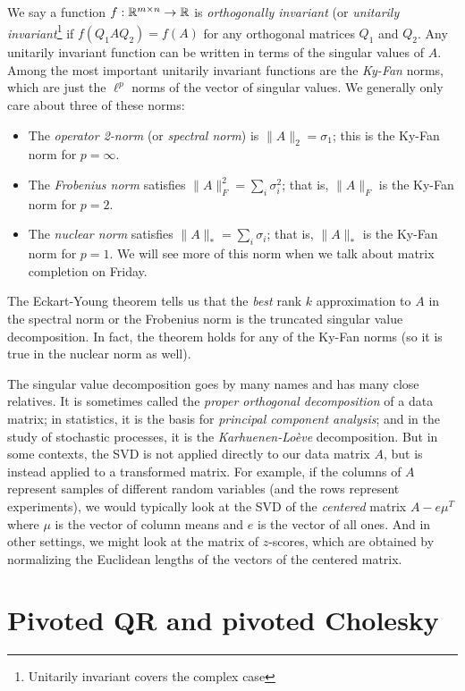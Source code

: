 \documentclass[12pt, leqno]{article} %
\begin{document}
We say a function $f : \mathbb{R}^{m \times n} \rightarrow \mathbb{R}$ is
{\em orthogonally invariant} (or {\em unitarily invariant}\footnote{%
  Unitarily invariant covers the complex case}
if $f(Q_1 A Q_2) = f(A)$ for any orthogonal matrices $Q_1$ and $Q_2$.
Any unitarily invariant function can be written in terms of the
singular values of $A$.  Among the most important unitarily invariant
functions are the {\em Ky-Fan} norms, which are just the $\ell^p$
norms of the vector of singular values.  We generally only care about three
of these norms:
\begin{itemize}
\item The {\em operator 2-norm} (or {\em spectral norm}) is
  $\|A\|_2 = \sigma_1$; this is the Ky-Fan norm for $p = \infty$.
\item The {\em Frobenius norm} satisfies
  $\|A\|_F^2 = \sum_i \sigma_i^2$; that is, $\|A\|_F$ is the
  Ky-Fan norm for $p = 2$.
\item The {\em nuclear norm} satisfies $\|A\|_* = \sum_i \sigma_i$;
  that is, $\|A\|_*$ is the Ky-Fan norm for $p = 1$.  We will see
  more of this norm when we talk about matrix completion on Friday.
\end{itemize}
The Eckart-Young theorem tells us that the {\em best} rank $k$ approximation
to $A$ in the spectral norm or the Frobenius norm is the truncated
singular value decomposition.  In fact, the theorem holds for any of
the Ky-Fan norms (so it is true in the nuclear norm as well).

The singular value decomposition goes by many names and has many close
relatives.  It is sometimes called the
{\em proper orthogonal decomposition} of a data matrix;
in statistics, it is the basis for {\em principal component analysis};
and in the study of stochastic processes,
it is the {\em Karhuenen-Lo\`eve} decomposition.
But in some contexts, the SVD is not applied directly to our data
matrix $A$, but is instead applied to a transformed matrix.  For
example, if the columns of $A$ represent samples of different random
variables (and the rows represent experiments), we would typically
look at the SVD of the {\em centered} matrix $A-e\mu^T$ where $\mu$ is
the vector of column means and $e$ is the vector of all ones.  And in
other settings, we might look at the matrix of $z$-scores, which are
obtained by normalizing the Euclidean lengths of the vectors of the
centered matrix.

\section{Pivoted QR and pivoted Cholesky}
\end{document}
